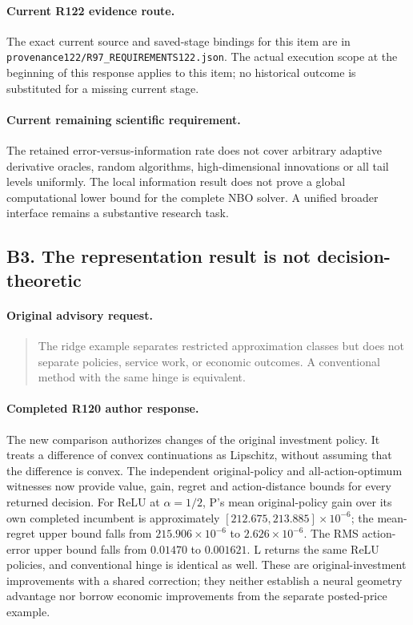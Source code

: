 \paragraph{Current R122 evidence route.}
The exact current source and saved-stage bindings for this item are in \nolinkurl{provenance122/R97_REQUIREMENTS122.json}. The actual execution scope at the beginning of this response applies to this item; no historical outcome is substituted for a missing current stage.
\paragraph{Current remaining scientific requirement.}
The retained error-versus-information rate does not cover arbitrary adaptive derivative oracles, random algorithms, high-dimensional innovations or all tail levels uniformly. The local information result does not prove a global computational lower bound for the complete NBO solver. A unified broader interface remains a substantive research task.

\subsection{B3. The representation result is not decision-theoretic}
\label{response122:B3}

\paragraph{Original advisory request.}
\begin{quote}
The ridge example separates restricted approximation classes but does not separate policies, service work, or economic outcomes. A conventional method with the same hinge is equivalent.
\end{quote}

\paragraph{Completed R120 author response.}
The new comparison authorizes changes of the original investment policy. It treats a difference of convex continuations as Lipschitz, without assuming that the difference is convex. The independent original-policy and all-action-optimum witnesses now provide value, gain, regret and action-distance bounds for every returned decision. For ReLU at $\alpha=1/2$, P's mean original-policy gain over its own completed incumbent is approximately $[212.675,213.885]\times10^{-6}$; the mean-regret upper bound falls from $215.906\times10^{-6}$ to $2.626\times10^{-6}$. The RMS action-error upper bound falls from $0.01470$ to $0.001621$. L returns the same ReLU policies, and conventional hinge is identical as well. These are original-investment improvements with a shared correction; they neither establish a neural geometry advantage nor borrow economic improvements from the separate posted-price example.

